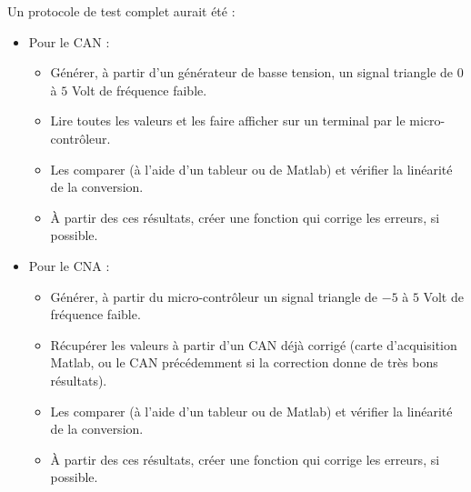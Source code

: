 Un protocole de test complet aurait été :\\
\begin{itemize}
\item Pour le CAN : 
	\begin{itemize}
		\item Générer, à partir d'un générateur de basse tension, un signal triangle de $0$ à $5$ Volt de fréquence faible.
		\item Lire toutes les valeurs et les faire afficher sur un terminal par le micro-contrôleur.
		\item Les comparer (à l'aide d'un tableur ou de Matlab) et vérifier la linéarité de la conversion.
		\item À partir des ces résultats, créer une fonction qui corrige les erreurs, si possible.
	\end{itemize}

\item Pour le CNA :
	\begin{itemize}
		\item Générer, à partir du micro-contrôleur un signal triangle de $-5$ à $5$ Volt de fréquence faible.
		\item Récupérer les valeurs à partir d'un CAN déjà corrigé (carte d'acquisition Matlab, ou le CAN précédemment si la correction donne de très bons résultats).
		\item Les comparer (à l'aide d'un tableur ou de Matlab) et vérifier la linéarité de la conversion.
		\item À partir des ces résultats, créer une fonction qui corrige les erreurs, si possible.
	\end{itemize}
\end{itemize}




